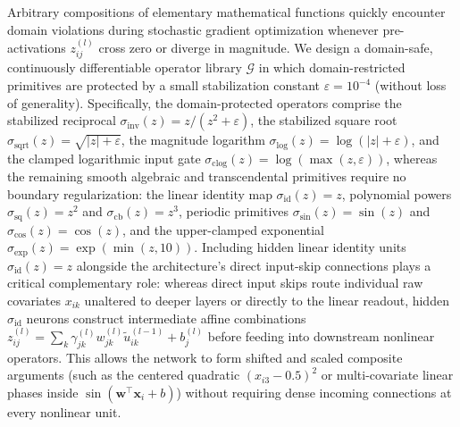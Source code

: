 \documentclass[11pt,a4paper]{article}
\begin{document}
Arbitrary compositions of elementary mathematical functions quickly encounter domain violations during stochastic gradient optimization whenever pre-activations $z_{ij}^{(l)}$ cross zero or diverge in magnitude. We design a domain-safe, continuously differentiable operator library $\mathcal{G}$ in which domain-restricted primitives are protected by a small stabilization constant $\varepsilon = 10^{-4}$ (without loss of generality). Specifically, the domain-protected operators comprise the stabilized reciprocal $\sigma_{\text{inv}}(z) = z / (z^2 + \varepsilon)$, the stabilized square root $\sigma_{\text{sqrt}}(z) = \sqrt{|z| + \varepsilon}$, the magnitude logarithm $\sigma_{\log}(z) = \log(|z| + \varepsilon)$, and the clamped logarithmic input gate $\sigma_{\text{clog}}(z) = \log(\max(z, \varepsilon))$, whereas the remaining smooth algebraic and transcendental primitives require no boundary regularization: the linear identity map $\sigma_{\text{id}}(z) = z$, polynomial powers $\sigma_{\text{sq}}(z) = z^2$ and $\sigma_{\text{cb}}(z) = z^3$, periodic primitives $\sigma_{\sin}(z) = \sin(z)$ and $\sigma_{\cos}(z) = \cos(z)$, and the upper-clamped exponential $\sigma_{\exp}(z) = \exp(\min(z, 10))$. Including hidden linear identity units $\sigma_{\text{id}}(z) = z$ alongside the architecture's direct input-skip connections plays a critical complementary role: whereas direct input skips route individual raw covariates $x_{ik}$ unaltered to deeper layers or directly to the linear readout, hidden $\sigma_{\text{id}}$ neurons construct intermediate affine combinations $z_{ij}^{(l)} = \sum_k \gamma_{jk}^{(l)} w_{jk}^{(l)} \tilde{u}_{ik}^{(l-1)} + b_j^{(l)}$ before feeding into downstream nonlinear operators. This allows the network to form shifted and scaled composite arguments (such as the centered quadratic $(x_{i3} - 0.5)^2$ or multi-covariate linear phases inside $\sin(\bm{w}^\top \bm{x}_i + b)$) without requiring dense incoming connections at every nonlinear unit.
\end{document}
